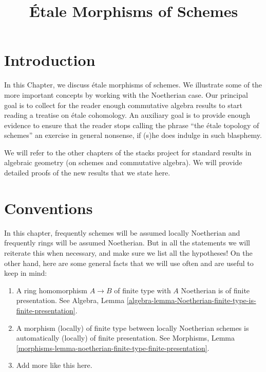 

%


\title{\'Etale Morphisms of Schemes}

\maketitle

\label{section-phantom}

\tableofcontents



\section{Introduction}
\label{section-introduction}

\noindent
In this Chapter, we discuss \'etale morphisms of schemes. We illustrate
some of the more important concepts by working with the Noetherian case.
Our principal goal is to collect for the reader enough commutative
algebra results to start reading a treatise on \'etale cohomology. An
auxiliary goal is to provide enough evidence to ensure that the reader stops
calling the phrase ``the \'etale topology of schemes'' an exercise in general
nonsense, if (s)he does indulge in such blasphemy.

\medskip\noindent
We will refer to the other
chapters of the stacks project for standard results in algebraic geometry
(on schemes and commutative algebra). We will provide detailed
proofs of the new results that we state here.




\section{Conventions}
\label{section-conventions}

\noindent
In this chapter, frequently schemes will be assumed locally Noetherian
and frequently rings will be assumed Noetherian. But in all the statements
we will reiterate this when necessary, and make sure we list all the
hypotheses! On the other hand, here are some general facts that we will use
often and are useful to keep in mind:
\begin{enumerate}
\item A ring homomorphism $A \to B$ of finite type with $A$ Noetherian
is of finite presentation. See Algebra,
Lemma \ref{algebra-lemma-Noetherian-finite-type-is-finite-presentation}.
\item A morphism (locally) of finite type between locally Noetherian schemes
is automatically (locally) of finite presentation.
See Morphisms,
Lemma \ref{morphisms-lemma-noetherian-finite-type-finite-presentation}.
\item Add more like this here.
\end{enumerate}




